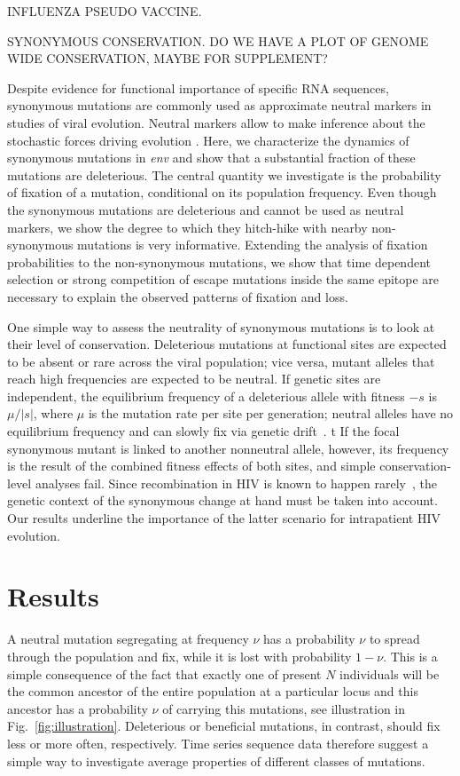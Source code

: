 \documentclass[rmp, twocolumn]{revtex4}
\newcommand{\mut}{\mu}
\newcommand{\env}{\textit{env}}
\newcommand{\FIG}[1]{Fig.~\ref{fig:#1}}
\begin{document}
INFLUENZA PSEUDO VACCINE.

SYNONYMOUS CONSERVATION. DO WE HAVE A PLOT OF GENOME WIDE CONSERVATION, MAYBE FOR SUPPLEMENT?

Despite evidence for functional importance of specific RNA sequences, synonymous mutations are commonly used as approximate neutral markers in studies of viral evolution. Neutral markers allow to make inference about the stochastic forces driving evolution \citep{smth}. Here, we characterize the dynamics of synonymous mutations in \env{} and show that a substantial fraction of these mutations are deleterious. The central quantity we investigate is the probability of fixation of a mutation, conditional on its population frequency. Even though the synonymous mutations are deleterious and cannot be used as neutral markers, we show the degree to which they hitch-hike with nearby non-synonymous mutations is very informative. Extending the analysis of fixation probabilities to the non-synonymous mutations, we show that time dependent selection or strong competition of escape mutations inside the same epitope are necessary to explain the observed patterns of fixation and loss. 


One simple way to assess the neutrality of synonymous mutations is to look at
their level of conservation. Deleterious mutations at functional sites are
expected to be absent or rare across the viral population; vice versa, mutant
alleles that reach high frequencies are expected to be neutral. If genetic sites
are independent, the equilibrium frequency of a deleterious allele with fitness
$-s$ is $\mut / |s|$, where $\mut$ is the mutation rate per site per generation;
neutral alleles have no equilibrium frequency and can slowly fix via genetic
drift~\citep{ewens_mathematical_2004}.
t If the focal synonymous mutant is linked
to another nonneutral allele, however, its frequency is the result of the
combined fitness effects of both sites, and simple conservation-level analyses
fail. Since recombination in HIV is known to happen
rarely~\citep{neher_recombination_2010, batorsky_estimate_2011}, the genetic
context of the synonymous change at hand must be taken into account. Our
results underline the importance of the latter scenario for intrapatient HIV
evolution.




\section{Results}
A neutral mutation segregating at frequency $\nu$ has a probability $\nu$ to spread through the population and fix, while it is lost with probability $1-\nu$. This is a simple consequence of the fact that exactly one of present $N$ individuals will be the common ancestor of the entire population at a particular locus and this ancestor has a probability $\nu$ of carrying this mutations, see illustration in \FIG{illustration}. Deleterious or beneficial mutations, in contrast, should fix less or more often, respectively. Time series sequence data therefore suggest a simple way to investigate average properties of different classes of mutations. 
\end{document}

